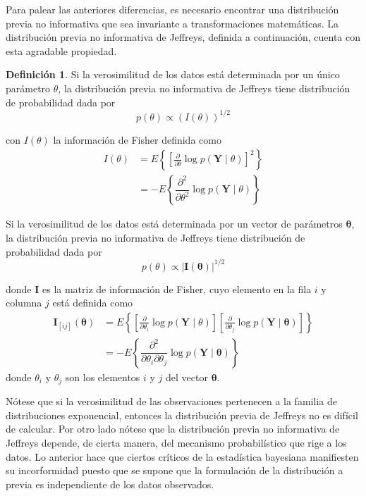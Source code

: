 \documentclass[
  spanish,
]{book}
\theoremstyle{definition}
\newtheorem{definition}{Definición}[chapter]
\theoremstyle{definition}
\theoremstyle{definition}
\theoremstyle{remark}
\begin{document}
Para palear las anteriores diferencias, es necesario encontrar una
distribución previa no informativa que sea invariante a
transformaciones matemáticas. La distribución previa no
informativa de Jeffreys, definida a continuación, cuenta con esta
agradable propiedad.

\begin{definition}
\protect\hypertarget{def:unnamed-chunk-16}{}{\label{def:unnamed-chunk-16} }Si la verosimilitud de los datos está determinada por un único parámetro \(\theta\), la distribución previa no informativa de Jeffreys tiene distribución de probabilidad dada por
\begin{equation}
p(\theta)\propto (I(\theta))^{1/2}
\end{equation}

con \(I(\theta)\) la información de Fisher definida como
\begin{align*}
I(\theta)&=E\left\{\left[\frac{\partial}{\partial\theta}\log{p(\mathbf{Y}\mid\theta)}\right]^2\right\}\\
&=-E\left\{\dfrac{\partial^2}{\partial\theta^2}\log{p(\mathbf{Y}\mid\theta)}\right\}
\end{align*}

Si la verosimilitud de los datos está determinada por un vector de parámetros \(\boldsymbol \theta\), la distribución previa no informativa de Jeffreys tiene distribución de probabilidad dada por
\begin{equation}
p(\theta)\propto |\mathbf{I}(\boldsymbol \theta)|^{1/2}
\end{equation}

donde \(\mathbf{I}\) es la matriz de información de Fisher, cuyo elemento en la fila \(i\) y columna \(j\) está definida como
\begin{align*}
\mathbf{I}_{[ij]}(\boldsymbol \theta)&=E\left\{\left[\frac{\partial}{\partial\theta_i}\log{p(\mathbf{Y}\mid\theta)}\right]\left[\frac{\partial}{\partial\theta_j}\log{p(\mathbf{Y}\mid\boldsymbol \theta)}\right]\right\}\\
&=-E\left\{\dfrac{\partial^2}{\partial\theta_i\partial\theta_j}\log{p(\mathbf{Y}\mid\boldsymbol \theta)}\right\}
\end{align*}
donde \(\theta_i\) y \(\theta_j\) son los elementos \(i\) y \(j\) del vector \(\boldsymbol \theta\).
\end{definition}

Nótese que si la verosimilitud de las observaciones pertenecen a la
familia de distribuciones exponencial, entonces la distribución previa
de Jeffreys no es difícil de calcular. Por otro lado nótese que la
distribución previa no informativa de Jeffreys depende, de cierta
manera, del mecanismo probabilístico que rige a los datos. Lo anterior
hace que ciertos críticos de la estadística bayesiana manifiesten su incorformidad puesto que se supone que la formulación de la distribución a
previa es independiente de los datos observados.
\end{document}
